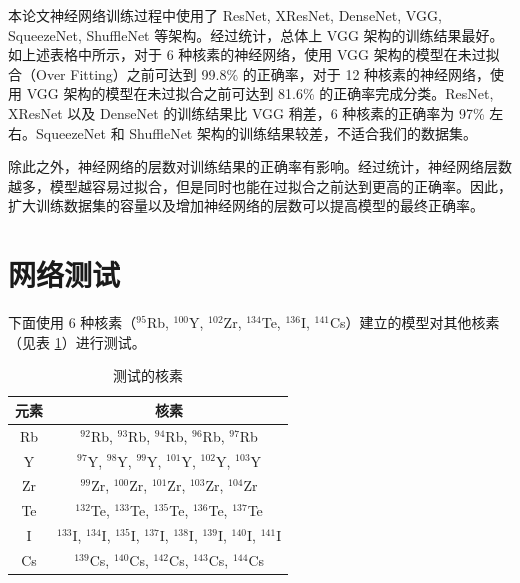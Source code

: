 \documentclass[AutoFakeBold]{LZUThesis}
\begin{document}
本论文神经网络训练过程中使用了 ResNet, XResNet, DenseNet, VGG, SqueezeNet, ShuffleNet 等架构。经过统计，总体上 VGG 架构的训练结果最好。如上述表格中所示，对于 6 种核素的神经网络，使用 VGG 架构的模型在未过拟合（Over Fitting）之前可达到 99.8\% 的正确率，对于 12 种核素的神经网络，使用 VGG 架构的模型在未过拟合之前可达到 81.6\% 的正确率完成分类。ResNet, XResNet 以及 DenseNet 的训练结果比 VGG 稍差，6 种核素的正确率为 97\% 左右。SqueezeNet 和 ShuffleNet 架构的训练结果较差，不适合我们的数据集。

除此之外，神经网络的层数对训练结果的正确率有影响。经过统计，神经网络层数越多，模型越容易过拟合，但是同时也能在过拟合之前达到更高的正确率。因此，扩大训练数据集的容量以及增加神经网络的层数可以提高模型的最终正确率。



\section{网络测试}
下面使用 6 种核素（$^{95}$Rb, $^{100}$Y, $^{102}$Zr, $^{134}$Te, $^{136}$I, $^{141}$Cs）建立的模型对其他核素（见表 \ref{tbl-tested-nuclides}）进行测试。

\begin{table}[H]
    \centering
    \caption{测试的核素}
    \begin{tabular}{cc} %
    \toprule
    元素 & 核素 \\
    \midrule
    Rb & $^{92}$Rb, $^{93}$Rb, $^{94}$Rb, $^{96}$Rb, $^{97}$Rb \\
    Y& $^{97}$Y, $^{98}$Y, $^{99}$Y, $^{101}$Y, $^{102}$Y, $^{103}$Y \\
    Zr& $^{99}$Zr, $^{100}$Zr, $^{101}$Zr, $^{103}$Zr, $^{104}$Zr \\
    Te& $^{132}$Te, $^{133}$Te, $^{135}$Te, $^{136}$Te, $^{137}$Te \\
    I& $^{133}$I, $^{134}$I, $^{135}$I, $^{137}$I, $^{138}$I, $^{139}$I, $^{140}$I, $^{141}$I \\
    Cs&  $^{139}$Cs, $^{140}$Cs, $^{142}$Cs, $^{143}$Cs, $^{144}$Cs\\
    \bottomrule
    \end{tabular}
    \label{tbl-tested-nuclides}
\end{table}


\end{document}
